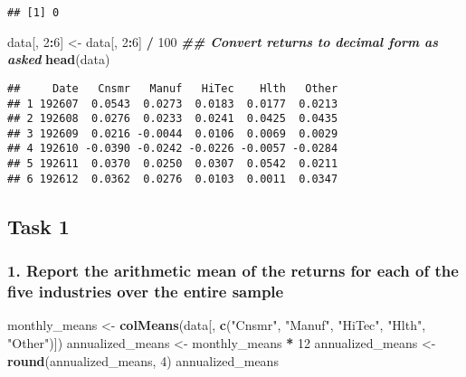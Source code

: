 \documentclass[
]{article}
\newenvironment{Shaded}{\begin{snugshade}}{\end{snugshade}}
\newcommand{\DecValTok}[1]{\textcolor[rgb]{0.00,0.00,0.81}{#1}}
\newcommand{\DocumentationTok}[1]{\textcolor[rgb]{0.56,0.35,0.01}{\textbf{\textit{#1}}}}
\newcommand{\FunctionTok}[1]{\textcolor[rgb]{0.13,0.29,0.53}{\textbf{#1}}}
\newcommand{\NormalTok}[1]{#1}
\newcommand{\OtherTok}[1]{\textcolor[rgb]{0.56,0.35,0.01}{#1}}
\newcommand{\SpecialCharTok}[1]{\textcolor[rgb]{0.81,0.36,0.00}{\textbf{#1}}}
\newcommand{\StringTok}[1]{\textcolor[rgb]{0.31,0.60,0.02}{#1}}
\begin{document}
\begin{verbatim}
## [1] 0
\end{verbatim}

\begin{Shaded}
\begin{Highlighting}[]
\NormalTok{data[, }\DecValTok{2}\SpecialCharTok{:}\DecValTok{6}\NormalTok{] }\OtherTok{\textless{}{-}}\NormalTok{ data[, }\DecValTok{2}\SpecialCharTok{:}\DecValTok{6}\NormalTok{] }\SpecialCharTok{/} \DecValTok{100} \DocumentationTok{\#\# Convert returns to decimal form as asked}
\FunctionTok{head}\NormalTok{(data)}
\end{Highlighting}
\end{Shaded}

\begin{verbatim}
##     Date   Cnsmr   Manuf   HiTec    Hlth   Other
## 1 192607  0.0543  0.0273  0.0183  0.0177  0.0213
## 2 192608  0.0276  0.0233  0.0241  0.0425  0.0435
## 3 192609  0.0216 -0.0044  0.0106  0.0069  0.0029
## 4 192610 -0.0390 -0.0242 -0.0226 -0.0057 -0.0284
## 5 192611  0.0370  0.0250  0.0307  0.0542  0.0211
## 6 192612  0.0362  0.0276  0.0103  0.0011  0.0347
\end{verbatim}

\hypertarget{task-1}{%
\subsection{Task 1}\label{task-1}}

\hypertarget{report-the-arithmetic-mean-of-the-returns-for-each-of-the-five-industries-over-the-entire-sample}{%
\subsubsection{1. Report the arithmetic mean of the returns for each of
the five industries over the entire
sample}\label{report-the-arithmetic-mean-of-the-returns-for-each-of-the-five-industries-over-the-entire-sample}}

\begin{Shaded}
\begin{Highlighting}[]
\NormalTok{monthly\_means }\OtherTok{\textless{}{-}} \FunctionTok{colMeans}\NormalTok{(data[, }\FunctionTok{c}\NormalTok{(}\StringTok{"Cnsmr"}\NormalTok{, }\StringTok{"Manuf"}\NormalTok{, }\StringTok{"HiTec"}\NormalTok{, }\StringTok{"Hlth"}\NormalTok{, }\StringTok{"Other"}\NormalTok{)]) }
\NormalTok{annualized\_means }\OtherTok{\textless{}{-}}\NormalTok{ monthly\_means }\SpecialCharTok{*} \DecValTok{12}
\NormalTok{annualized\_means }\OtherTok{\textless{}{-}} \FunctionTok{round}\NormalTok{(annualized\_means, }\DecValTok{4}\NormalTok{)}
\NormalTok{annualized\_means}
\end{Highlighting}
\end{Shaded}
\end{document}
